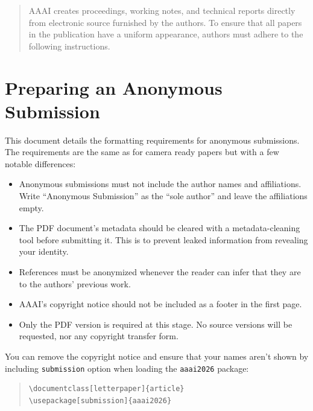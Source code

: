 \makeatletter
{}
\makeatother
\providecommand{\tightlist}{%
  \setlength{\itemsep}{0pt}\setlength{\parskip}{0pt}} 

\maketitle
\begin{abstract}
AAAI creates proceedings, working notes, and technical reports directly
from electronic source furnished by the authors. To ensure that all
papers in the publication have a uniform appearance, authors must adhere
to the following instructions.
\end{abstract}
\section{Preparing an Anonymous
Submission}\label{preparing-an-anonymous-submission}

This document details the formatting requirements for anonymous
submissions. The requirements are the same as for camera ready papers
but with a few notable differences:

\begin{itemize}
\tightlist
\item
  Anonymous submissions must not include the author names and
  affiliations. Write ``Anonymous Submission'' as the ``sole author''
  and leave the affiliations empty.
\item
  The PDF document's metadata should be cleared with a metadata-cleaning
  tool before submitting it. This is to prevent leaked information from
  revealing your identity.
\item
  References must be anonymized whenever the reader can infer that they
  are to the authors' previous work.
\item
  AAAI's copyright notice should not be included as a footer in the
  first page.
\item
  Only the PDF version is required at this stage. No source versions
  will be requested, nor any copyright transfer form.
\end{itemize}

You can remove the copyright notice and ensure that your names aren't
shown by including \texttt{submission} option when loading the
\texttt{aaai2026} package:

\begin{quote}\begin{scriptsize}\begin{verbatim}
\documentclass[letterpaper]{article}
\usepackage[submission]{aaai2026}
\end{verbatim}\end{scriptsize}\end{quote}

